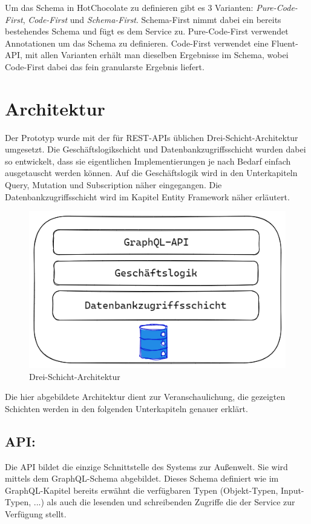 Um das Schema in HotChocolate zu definieren gibt es 3 Varianten: \textit{Pure-Code-First}, \textit{Code-First} und \textit{Schema-First}.
Schema-First nimmt dabei ein bereits bestehendes Schema und fügt es dem Service zu.
Pure-Code-First verwendet Annotationen um das Schema zu definieren.
Code-First verwendet eine Fluent-API, mit allen Varianten erhält man dieselben Ergebnisse im Schema, wobei Code-First dabei das fein granularste Ergebnis liefert.


\section{Architektur}
Der Prototyp wurde mit der für REST-APIs üblichen Drei-Schicht-Architektur umgesetzt.
Die Geschäftslogikschicht und Datenbankzugriffsschicht wurden dabei so entwickelt, dass sie eigentlichen Implementierungen je nach Bedarf einfach ausgetauscht werden können.
Auf die Geschäftslogik wird in den Unterkapiteln Query, Mutation und Subscription näher eingegangen. Die Datenbankzugriffsschicht wird im Kapitel Entity Framework näher erläutert.
\newline

\begin{figure}[H]
    \includegraphics[width=\textwidth]{pics/architecture.png}
    \caption{Drei-Schicht-Architektur}
\end{figure}

Die hier abgebildete Architektur dient zur Veranschaulichung, die gezeigten Schichten werden in den folgenden Unterkapiteln genauer erklärt.

\subsection{API:}
Die API bildet die einzige Schnittstelle des Systems zur Außenwelt.
Sie wird mittels dem GraphQL-Schema abgebildet.
Dieses Schema definiert wie im GraphQL-Kapitel bereits erwähnt die verfügbaren Typen (Objekt-Typen, Input-Typen, ...) als auch die lesenden und schreibenden Zugriffe die der Service zur Verfügung stellt.

